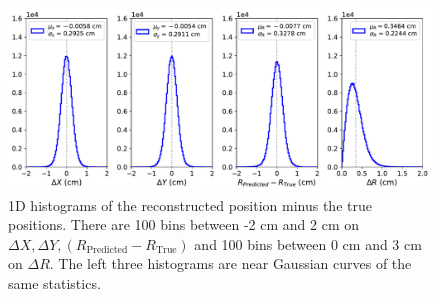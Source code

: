 \documentclass[thesis.tex]{subfiles}
\begin{document}
\begin{figure}[t]
	\centering
	\includegraphics[width=0.9\linewidth]{figures/1D_hist_Delaunay-Prenoise.pdf}
	\caption{
	1D histograms of the reconstructed position minus the true positions.
	There are 100 bins between -2 cm and 2 cm on $\Delta X, \Delta Y, (R_\text{Predicted} - R_\text{True})$ and 100 bins between 0 cm and 3 cm on $\Delta R$.
	The left three histograms are near Gaussian curves of the same statistics.
	}
	\label{fig:1D_Hist}
\end{figure}
\end{document}

